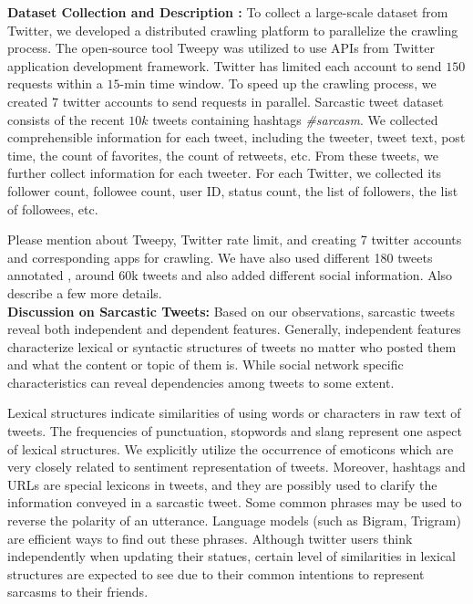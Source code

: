 \noindent \textbf{Dataset Collection and Description :} To collect a large-scale dataset from Twitter, we developed a distributed crawling platform to parallelize the crawling process. The open-source tool Tweepy was utilized to use APIs from Twitter application development framework. Twitter has limited each account to send $150$ requests within a $15$-min time window. To speed up the crawling process, we created $7$ twitter accounts to send requests in parallel. Sarcastic tweet dataset consists of the recent $10k$ tweets containing hashtags \emph{\#sarcasm}. We collected comprehensible information for each tweet, including the tweeter, tweet text, post time, the count of favorites, the count of retweets, etc. From these tweets, we further collect information for each tweeter. For each Twitter, we collected its follower count, followee count, user ID, status count, the list of followers, the list of followees, etc.
 
Please mention about Tweepy, Twitter rate limit, and creating 7 twitter accounts and corresponding apps for crawling. We have also used different 180 tweets annotated \cite{davidov10}, around 60k tweets \cite{tomas14} and also added different social information. Also describe a few more details.\\

\noindent \textbf{Discussion on Sarcastic Tweets: }Based on our observations, sarcastic tweets reveal both independent and dependent features. Generally, independent features characterize lexical or syntactic structures of tweets no matter who posted
them and what the content or topic of them is. While social network specific characteristics can reveal dependencies among tweets to some extent.

Lexical structures indicate similarities of using words or characters in raw text of tweets. The frequencies of punctuation, stopwords and slang represent one aspect of lexical structures. We explicitly utilize the occurrence of emoticons which are very closely related to sentiment representation of tweets. Moreover, hashtags and URLs are special lexicons in tweets, and they are possibly used to clarify the information conveyed in a sarcastic tweet. Some common phrases may be used to reverse the polarity of an utterance. Language models (such as Bigram, Trigram) are efficient ways to find out these phrases. Although twitter users think independently when updating their statues, certain level of similarities in lexical structures are expected to see due to their common intentions to represent sarcasms to their friends.

